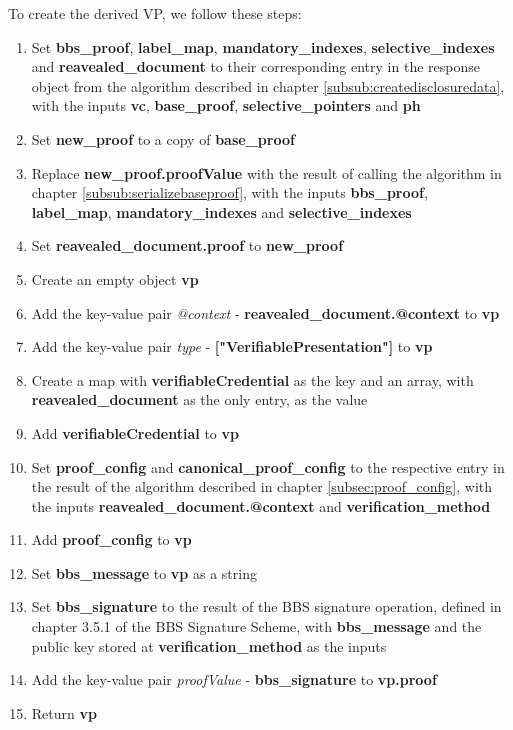 \documentclass[
	a4paper               %
	,BCOR=0mm            %
	,bibliography=totoc   %
	,listof=totoc         %
	,monolingual
	,twoside=false
]{bfhthesis}              %
\begin{document}
To create the derived VP, we follow these steps:
\begin{enumerate}
	\item Set \textbf{bbs\_proof}, \textbf{label\_map}, \textbf{mandatory\_indexes}, \textbf{selective\_indexes} and \textbf{reavealed\_document} to their corresponding entry in the response object from the algorithm described in chapter \ref{subsub:createdisclosuredata}, with the inputs \textbf{vc}, \textbf{base\_proof}, \textbf{selective\_pointers} and \textbf{ph}
	\item Set \textbf{new\_proof} to a copy of \textbf{base\_proof}
	\item Replace \textbf{new\_proof.proofValue} with the result of calling the algorithm in chapter \ref{subsub:serializebaseproof}, with the inputs \textbf{bbs\_proof}, \textbf{label\_map}, \textbf{mandatory\_indexes} and \textbf{selective\_indexes}
	\item Set \textbf{reavealed\_document.proof} to \textbf{new\_proof}
	\item Create an empty object \textbf{vp}
	\item Add the key-value pair \textit{@context} - \textbf{reavealed\_document.@context} to \textbf{vp}
	\item Add the key-value pair \textit{type} - \textbf{["VerifiablePresentation"]} to \textbf{vp}
	\item Create a map with \textbf{verifiableCredential} as the key and an array, with \textbf{reavealed\_document} as the only entry, as the value
	\item Add \textbf{verifiableCredential} to \textbf{vp}
	\item Set \textbf{proof\_config} and \textbf{canonical\_proof\_config} to the respective entry in the result of the algorithm described in chapter \ref{subsec:proof_config}, with the inputs \textbf{reavealed\_document.@context} and \textbf{verification\_method}
	\item Add \textbf{proof\_config} to \textbf{vp}
	\item Set \textbf{bbs\_message} to \textbf{vp} as a string
	\item Set \textbf{bbs\_signature} to the result of the BBS signature operation, defined in chapter 3.5.1 of the BBS Signature Scheme\cite{bbs-signature-scheme}, with \textbf{bbs\_message} and the public key stored at \textbf{verification\_method} as the inputs
	\item Add the key-value pair \textit{proofValue} - \textbf{bbs\_signature} to \textbf{vp.proof}
	\item Return \textbf{vp}
\end{enumerate}
\end{document}
